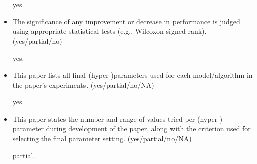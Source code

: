 \begin{itemize}
yes.

\item The significance of any improvement or decrease in performance is judged using appropriate statistical tests (e.g., Wilcoxon signed-rank). (yes/partial/no)

yes.

\item This paper lists all final (hyper-)parameters used for each model/algorithm in the paper’s experiments. (yes/partial/no/NA)

yes.

\item This paper states the number and range of values tried per (hyper-) parameter during development of the paper, along with the criterion used for selecting the final parameter setting. (yes/partial/no/NA)

partial.

\end{itemize}

